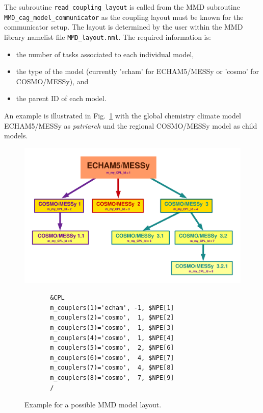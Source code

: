 \documentclass[twoside]{article}
\begin{document}
\begin{itemize}
The subroutine \verb|read_coupling_layout| is called from the MMD subroutine
\verb|MMD_cag_model_communicator| as the coupling layout must be known for the 
communicator setup. The layout is determined by the user within the
MMD library namelist file \verb|MMD_layout.nml|. The required information is:
\begin{itemize}
\item the number of tasks associated to each individual model,
\item the type of the model (currently 'echam' for ECHAM5/MESSy or 'cosmo' for
COSMO/MESSy), and 
\item the parent ID of each model.
\end{itemize} 
An example is illustrated in Fig.\ 
\ref{fig:modeltree} with the global chemistry climate model ECHAM5/MESSy as 
{\it patriarch} und the regional COSMO/MESSy model as child models.
\begin{figure}
\begin{center} 
\includegraphics[width=\textwidth]{MMDlib_model_layout.pdf} 
\end{center} 
\vspace*{-2.95cm}
\begin{verbatim} 
       &CPL
       m_couplers(1)='echam', -1, $NPE[1]
       m_couplers(2)='cosmo',  1, $NPE[2]
       m_couplers(3)='cosmo',  1, $NPE[3]
       m_couplers(4)='cosmo',  1, $NPE[4]
       m_couplers(5)='cosmo',  2, $NPE[6]
       m_couplers(6)='cosmo',  4, $NPE[7]
       m_couplers(7)='cosmo',  4, $NPE[8]
       m_couplers(8)='cosmo',  7, $NPE[9]
       /
\end{verbatim} 
\vspace*{-0.5cm}
\caption{Example for a possible MMD model layout.} 
\label{fig:modeltree} 
\end{figure} 


\end{itemize}
\end{document}
